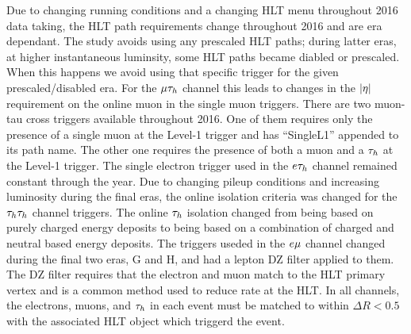 Due to changing running conditions and a changing HLT menu throughout 2016 data taking, the HLT path
requirements change throughout 2016 and are era dependant.  The study avoids using any prescaled
HLT paths; during latter eras, at higher instantaneous luminsity, some HLT paths became diabled
or prescaled.  When this happens we avoid using that specific trigger for the given prescaled/disabled
era.  For the $\mu\tau_{h}$ channel this 
leads to changes in the $\lvert\eta\rvert$ requirement on the online muon in the single muon triggers.
There are two muon-tau cross triggers available throughout 2016.  One of them requires only the
presence of a single muon at the Level-1 trigger and has ``SingleL1'' appended to its path
name.  The other one requires the presence of both a muon and a $\tau_{h}$ at the Level-1 trigger.
The single electron trigger used in the $e\tau_{h}$ channel remained constant through the year.
Due to changing pileup conditions and increasing luminosity during the final eras, the online
isolation criteria was changed for the $\tau_{h}\tau_{h}$ channel triggers.  The online $\tau_{h}$ 
isolation changed from being based on purely charged energy deposits to being based on a 
combination of charged and neutral based energy deposits.  The triggers useded in the
$e\mu$ channel changed during the final two eras, G and H, and had a lepton DZ filter
applied to them.  The DZ filter requires that the electron and muon match to the HLT primary
vertex and is a common method used to reduce rate at the HLT.  In all channels, the electrons, muons, and
$\tau_{h}$ in each event must be matched to within $\Delta R < 0.5$ with the associated
HLT object which triggerd the event.


